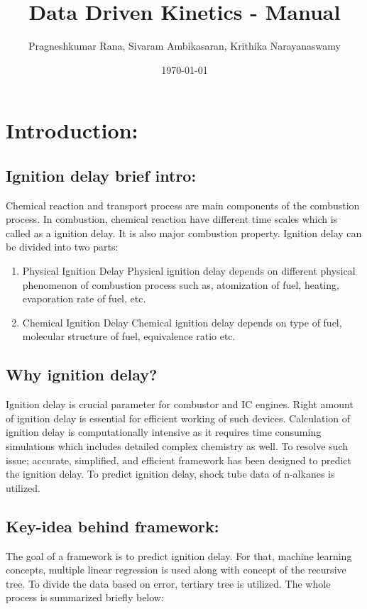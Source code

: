 \documentclass[12pt]{article}
\title{Data Driven Kinetics - Manual}
\author{Pragneshkumar Rana, Sivaram Ambikasaran, Krithika Narayanaswamy}
\date{\today}
\begin{document}
\maketitle{}

\tableofcontents
\listoffigures
\clearpage
\newpage

\section{Introduction:}


\subsection{Ignition delay brief intro:}


 Chemical reaction and transport process are main components of the combustion process. In combustion, chemical reaction have different time scales which is called as a ignition delay. It is also major combustion property. Ignition delay can be divided into two parts: 
 \begin{enumerate}
 	\item Physical Ignition Delay 
 	\subitem Physical ignition delay depends on different physical phenomenon of combustion process such as, atomization of fuel, heating, evaporation rate of fuel, etc.
 	\item Chemical Ignition Delay
 	\subitem Chemical ignition delay depends on type of fuel, molecular structure of fuel, equivalence ratio etc. 
 \end{enumerate} 
 
 \subsection{Why ignition delay?} 
 Ignition delay is crucial parameter for combustor and IC engines. Right amount of ignition delay is essential for efficient working of such devices. Calculation of ignition delay is computationally intensive as it requires time consuming simulations which includes detailed complex chemistry as well. To resolve such issue; accurate, simplified, and efficient framework has been designed to predict the ignition delay. To predict ignition delay, shock tube data of n-alkanes is utilized. 

\subsection{Key-idea behind framework:} \label{sec:key_idea}
The goal of a framework is to predict ignition delay. For that, machine learning concepts, multiple linear regression is used along with concept of the recursive tree. To divide the data based on error, tertiary tree is utilized. The whole process is summarized briefly below:
\end{document}
